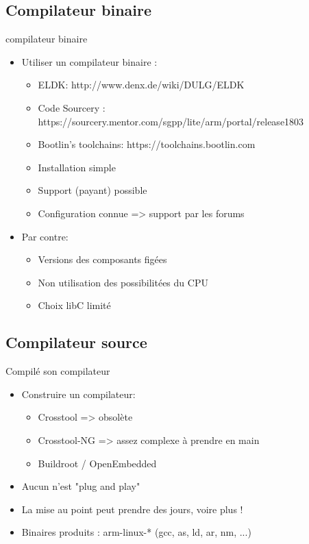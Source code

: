 \subsection{Compilateur binaire}
\begin{frame}{compilateur binaire}
  \begin{itemize}
  \item Utiliser un compilateur binaire :
    \begin{itemize}
    \item ELDK: http://www.denx.de/wiki/DULG/ELDK
    \item Code Sourcery : https://sourcery.mentor.com/sgpp/lite/arm/portal/release1803
    \item Bootlin's toolchains: https://toolchains.bootlin.com
    \item Installation simple
    \item Support (payant) possible
    \item Configuration connue => support par les forums
    \end{itemize}
  \item Par contre:
    \begin{itemize}
    \item Versions des composants figées
    \item Non utilisation des possibilitées du CPU
    \item Choix libC limité
    \end{itemize}
  \end{itemize}
\end{frame}

\subsection{Compilateur source}
\begin{frame}{Compilé son compilateur}
  \begin{itemize}
  \item Construire un compilateur:
    \begin{itemize}
    \item Crosstool => obsolète
    \item Crosstool-NG => assez complexe à prendre en main
    \item Buildroot / OpenEmbedded
    \end{itemize}
  \item Aucun n'est "plug and play"
  \item La mise au point peut prendre des jours, voire plus !
  \item Binaires produits : arm-linux-* (gcc, as, ld, ar, nm, ...)
  \end{itemize}
\end{frame}

